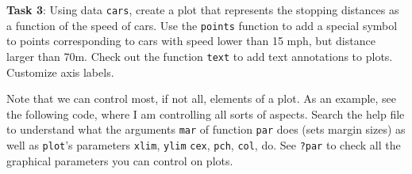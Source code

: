 \documentclass[
]{article}
\begin{document}
\textbf{Task 3}: Using data \texttt{cars}, create a plot that represents
the stopping distances as a function of the speed of cars. Use the
\texttt{points} function to add a special symbol to points corresponding
to cars with speed lower than 15 mph, but distance larger than 70m.
Check out the function \texttt{text} to add text annotations to plots.
Customize axis labels.

Note that we can control most, if not all, elements of a plot. As an
example, see the following code, where I am controlling all sorts of
aspects. Search the help file to understand what the arguments
\texttt{mar} of function \texttt{par} does (sets margin sizes) as well
as \texttt{plot}'s parameters \texttt{xlim}, \texttt{ylim} \texttt{cex},
\texttt{pch}, \texttt{col}, do. See \texttt{?par} to check all the
graphical parameters you can control on plots.
\end{document}
